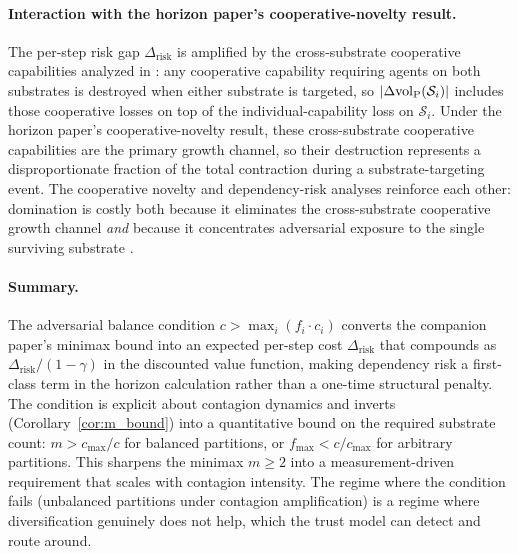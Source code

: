 \paragraph{Interaction with the horizon paper's cooperative-novelty result.}
The per-step risk gap $\Delta_{\mathrm{risk}}$ is amplified by the
cross-substrate cooperative capabilities analyzed in
\citet{lasser2026horizon}: any
cooperative capability requiring agents on both substrates is
destroyed when either substrate is targeted, so
$|\Delta {\operatorname{vol}_{\mathrm{P}}}(\mathcal{S}_i)|$ includes those cooperative losses on
top of the individual-capability loss on $\mathcal{S}_i$. Under the
horizon paper's cooperative-novelty result, these cross-substrate
cooperative capabilities are the primary growth channel, so their
destruction represents a disproportionate fraction of the total
contraction during a substrate-targeting event. The cooperative
novelty and dependency-risk analyses reinforce each other: domination
is costly both because it eliminates the cross-substrate cooperative
growth channel \emph{and} because it concentrates adversarial
exposure to the single surviving substrate
\citep{lasser2026horizon}.

\paragraph{Summary.} The adversarial balance condition
$c > \max_i (f_i \cdot c_i)$ converts the companion paper's minimax
bound into an expected per-step cost $\Delta_{\mathrm{risk}}$ that
compounds as $\Delta_{\mathrm{risk}} / (1 - \gamma)$ in the
discounted value function, making dependency risk a first-class term
in the horizon calculation rather than a one-time structural
penalty. The condition is explicit about contagion dynamics and
inverts (Corollary~\ref{cor:m_bound}) into a quantitative bound on
the required substrate count: $m > c_{\max}/c$ for balanced
partitions, or $f_{\max} < c / c_{\max}$ for arbitrary partitions.
This sharpens the minimax $m \geq 2$ into a measurement-driven
requirement that scales with contagion intensity. The regime where
the condition fails (unbalanced partitions under contagion
amplification) is a regime where diversification genuinely does
not help, which the trust model can detect and route around.
